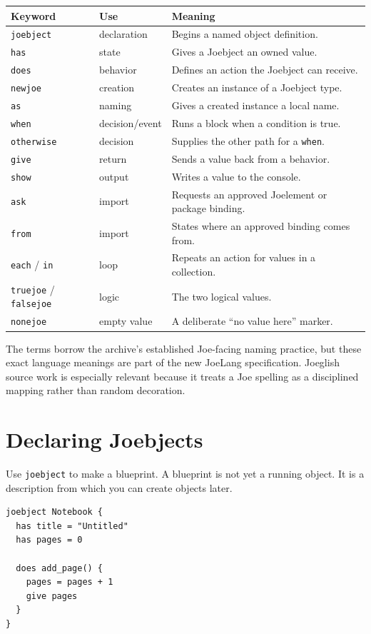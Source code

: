 \documentclass[12pt]{article}
\newcommand{\kw}[1]{\texttt{#1}}
\begin{document}
\begin{longtable}{p{}p{}p{}}
\toprule
\textbf{Keyword} & \textbf{Use} & \textbf{Meaning}\\
\midrule
\endhead
\kw{joebject} & declaration & Begins a named object definition.\\
\kw{has} & state & Gives a Joebject an owned value.\\
\kw{does} & behavior & Defines an action the Joebject can receive.\\
\kw{newjoe} & creation & Creates an instance of a Joebject type.\\
\kw{as} & naming & Gives a created instance a local name.\\
\kw{when} & decision/event & Runs a block when a condition is true.\\
\kw{otherwise} & decision & Supplies the other path for a \kw{when}.\\
\kw{give} & return & Sends a value back from a behavior.\\
\kw{show} & output & Writes a value to the console.\\
\kw{ask} & import & Requests an approved Joelement or package binding.\\
\kw{from} & import & States where an approved binding comes from.\\
\kw{each} / \kw{in} & loop & Repeats an action for values in a collection.\\
\kw{truejoe} / \kw{falsejoe} & logic & The two logical values.\\
\kw{nonejoe} & empty value & A deliberate ``no value here'' marker.\\
\bottomrule
\end{longtable}

The terms borrow the archive's established Joe-facing naming practice, but these exact language meanings are part of the new JoeLang specification. Joeglish source work is especially relevant because it treats a Joe spelling as a disciplined mapping rather than random decoration.\cite{translatorSource,translatorEngine}

\clearpage
\section{Declaring Joebjects}
Use \kw{joebject} to make a blueprint. A blueprint is not yet a running object. It is a description from which you can create objects later.

\begin{lstlisting}[style=joe]
joebject Notebook {
  has title = "Untitled"
  has pages = 0

  does add_page() {
    pages = pages + 1
    give pages
  }
}
\end{lstlisting}
\end{document}
